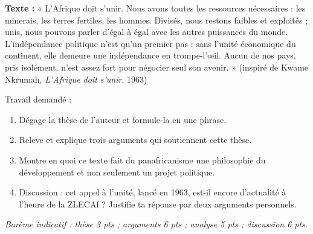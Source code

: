 \documentclass[11pt]{article}
\begin{document}
\begin{exercice}
\textbf{Texte :} « L'Afrique doit s'unir. Nous avons toutes les ressources nécessaires : les minerais, les terres fertiles, les hommes. Divisés, nous restons faibles et exploités ; unis, nous pouvons parler d'égal à égal avec les autres puissances du monde. L'indépendance politique n'est qu'un premier pas : sans l'unité économique du continent, elle demeure une indépendance en trompe-l'œil. Aucun de nos pays, pris isolément, n'est assez fort pour négocier seul son avenir. » (inspiré de Kwame Nkrumah, \emph{L'Afrique doit s'unir}, 1963)

Travail demandé :
\begin{enumerate}
\item Dégage la thèse de l'auteur et formule-la en une phrase.
\item Releve et explique trois arguments qui soutiennent cette thèse.
\item Montre en quoi ce texte fait du panafricanisme une philosophie du développement et non seulement un projet politique.
\item Discussion : cet appel à l'unité, lancé en 1963, est-il encore d'actualité à l'heure de la ZLECAf ? Justifie ta réponse par deux arguments personnels.
\end{enumerate}
\emph{Barème indicatif : thèse 3 pts ; arguments 6 pts ; analyse 5 pts ; discussion 6 pts.}
\end{exercice}
\end{document}
